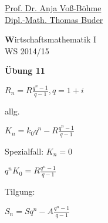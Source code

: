 \documentclass[12pt,a4paper]{scrreprt}
\begin{document}
 
\begin{flushleft}
\href{mailto:anja.voss-boehme@htw-dresden.de}{Prof. Dr. Anja Voß-Böhme} \\
\href{mailto:buder@htw-dresden.de}{Dipl.-Math. Thomas Buder}
\end{flushleft}

\begin{center}{\large\textbf Wirtschaftsmathematik I} \\ WS 2014/15 \end{center}

\begin{center}{\large\textbf{Übung 11}} 
\end{center}


\bigskip



$R_n = R \frac{q^n-1}{q-1}, q=1+i$

allg.

$K_n = k_0 q^n - R \frac{q^n-1}{q-1}$

Spezialfall: $K_n = 0$

$q^n K_0 = R \frac{q^n-1}{q-1}$

Tilgung:

$S_n = S q^n - A \frac{q^n-1}{q-1}$
\end{document}
